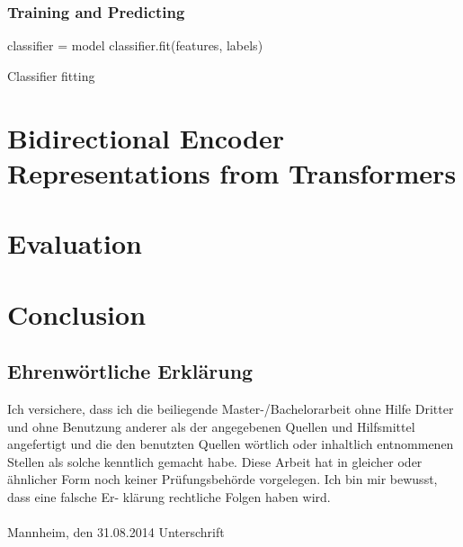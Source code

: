 \documentclass[a4paper, 11pt,titlepage,oneside,openany]{book}
\begin{document}
\subsection{Training and Predicting}
\begin{algorithm}
	\DontPrintSemicolon
	classifier = model\;
	classifier.fit(features, labels)
	\caption{Classifier fitting}
\end{algorithm}
\chapter{Bidirectional Encoder Representations from Transformers}
\chapter{Evaluation}
\chapter{Conclusion}

\pagestyle{empty}

\newpage
\section*{Ehrenw\"ortliche Erkl\"arung}
Ich versichere, dass ich die beiliegende Master-/Bachelorarbeit ohne Hilfe Dritter
und ohne Benutzung anderer als der angegebenen Quellen und Hilfsmittel
angefertigt und die den benutzten Quellen w\"ortlich oder inhaltlich
entnommenen Stellen als solche kenntlich gemacht habe. Diese Arbeit
hat in gleicher oder \"ahnlicher Form noch keiner Pr\"ufungsbeh\"orde
vorgelegen. Ich bin mir bewusst, dass eine falsche Er- kl\"arung rechtliche Folgen haben
wird.
\\
\\

\noindent
Mannheim, den 31.08.2014 \hspace{4cm} Unterschrift
\end{document}
